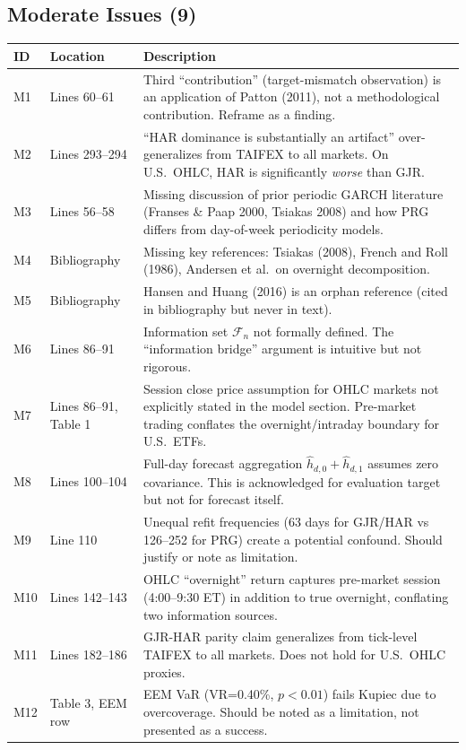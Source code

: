 \documentclass[12pt,a4paper]{article}
\begin{document}
\subsection*{\textcolor{warncolor}{Moderate Issues (9)}}

\begin{longtable}{p{1.2cm}p{2.5cm}p{10cm}}
\toprule
ID & Location & Description \\
\midrule
M1 & Lines 60--61 & Third ``contribution'' (target-mismatch observation) is an application of Patton (2011), not a methodological contribution. Reframe as a finding. \\
M2 & Lines 293--294 & ``HAR dominance is substantially an artifact'' over-generalizes from TAIFEX to all markets. On U.S.\ OHLC, HAR is significantly \emph{worse} than GJR. \\
M3 & Lines 56--58 & Missing discussion of prior periodic GARCH literature (Franses \& Paap 2000, Tsiakas 2008) and how PRG differs from day-of-week periodicity models. \\
M4 & Bibliography & Missing key references: Tsiakas (2008), French and Roll (1986), Andersen et al.\ on overnight decomposition. \\
M5 & Bibliography & Hansen and Huang (2016) is an orphan reference (cited in bibliography but never in text). \\
M6 & Lines 86--91 & Information set $\mathcal{F}_n$ not formally defined. The ``information bridge'' argument is intuitive but not rigorous. \\
M7 & Lines 86--91, Table 1 & Session close price assumption for OHLC markets not explicitly stated in the model section. Pre-market trading conflates the overnight/intraday boundary for U.S.\ ETFs. \\
M8 & Lines 100--104 & Full-day forecast aggregation $\hat{h}_{d,0} + \hat{h}_{d,1}$ assumes zero covariance. This is acknowledged for evaluation target but not for forecast itself. \\
M9 & Line 110 & Unequal refit frequencies (63 days for GJR/HAR vs 126--252 for PRG) create a potential confound. Should justify or note as limitation. \\
M10 & Lines 142--143 & OHLC ``overnight'' return captures pre-market session (4:00--9:30 ET) in addition to true overnight, conflating two information sources. \\
M11 & Lines 182--186 & GJR-HAR parity claim generalizes from tick-level TAIFEX to all markets. Does not hold for U.S.\ OHLC proxies. \\
M12 & Table 3, EEM row & EEM VaR (VR=0.40\%, $p<0.01$) fails Kupiec due to overcoverage. Should be noted as a limitation, not presented as a success. \\
\bottomrule
\end{longtable}
\end{document}
